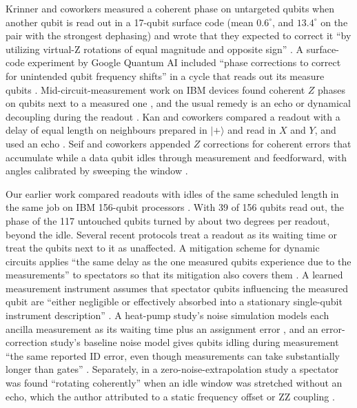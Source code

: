 \documentclass[reprint,amsmath,amssymb,aps,superscriptaddress,nofootinbib]{revtex4-2}
\begin{document}
Krinner and coworkers measured a coherent phase on untargeted qubits when another qubit is read out in a 17-qubit surface code (mean $0.6^\circ$, and $13.4^\circ$ on the pair with the strongest dephasing) and wrote that they expected to correct it ``by utilizing virtual-Z rotations of equal magnitude and opposite sign'' \cite{Krinner2022}. A surface-code experiment by Google Quantum AI included ``phase corrections to correct for unintended qubit frequency shifts'' in a cycle that reads out its measure qubits \cite{Google2023}. Mid-circuit-measurement work on IBM devices found coherent $Z$ phases on qubits next to a measured one \cite{Govia2023,Chen2022}, and the usual remedy is an echo or dynamical decoupling during the readout \cite{Shirizly2025,Chen2022,Bultink2020,Kan2026}. Kan and coworkers compared a readout with a delay of equal length on neighbours prepared in $|+\rangle$ and read in $X$ and $Y$, and used an echo \cite{Kan2026}. Seif and coworkers appended $Z$ corrections for coherent errors that accumulate while a data qubit idles through measurement and feedforward, with angles calibrated by sweeping the window \cite{Seif2024}.

Our earlier work compared readouts with idles of the same scheduled length in the same job on IBM 156-qubit processors \cite{readout}. With 39 of 156 qubits read out, the phase of the 117 untouched qubits turned by about two degrees per readout, beyond the idle. Several recent protocols treat a readout as its waiting time or treat the qubits next to it as unaffected. A mitigation scheme for dynamic circuits applies ``the same delay as the one measured qubits experience due to the measurements'' to spectators so that its mitigation also covers them \cite{SantosUzdin2025}. A learned measurement instrument assumes that spectator qubits influencing the measured qubit are ``either negligible or effectively absorbed into a stationary single-qubit instrument description'' \cite{Chu2026}. A heat-pump study's noise simulation models each ancilla measurement as its waiting time plus an assignment error \cite{Caselli2026}, and an error-correction study's baseline noise model gives qubits idling during measurement ``the same reported ID error, even though measurements can take substantially longer than gates'' \cite{McLauchlan2026}. Separately, in a zero-noise-extrapolation study a spectator was found ``rotating coherently'' when an idle window was stretched without an echo, which the author attributed to a static frequency offset or ZZ coupling \cite{Kumar2026}.
\end{document}
